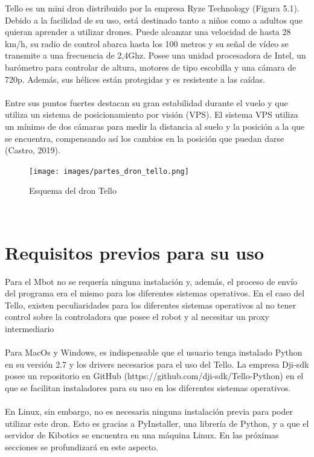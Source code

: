 \documentclass{report}
\begin{document}
Tello es un mini dron distribuido por la empresa Ryze Technology (Figura 5.1). Debido a la facilidad de su uso, está destinado tanto a niños como a adultos que quieran aprender a utilizar drones. Puede alcanzar una velocidad de hasta 28 km/h, su radio de control abarca hasta los 100 metros y su señal de vídeo se transmite a una frecuencia de 2,4Ghz. Posee una unidad procesadora de Intel, un barómetro para controlar de altura, motores de tipo escobilla y una cámara de 720p. Además, sus hélices están protegidas y es resistente a las caídas.
\\
\\
Entre sus puntos fuertes destacan su gran estabilidad durante el vuelo y que utiliza un sistema de posicionamiento por visión (VPS). El sistema VPS utiliza un mínimo de dos cámaras para medir la distancia al suelo y la posición a la que se encuentra, compensando así los cambios en la posición que puedan darse (Castro, 2019).
\\
\begin{figure}[h!]
  \centering
    \texttt{[image: images/partes\_dron\_tello.png]}
  \caption{Esquema del dron Tello}
  \label{Esquema del dron Tello}
\end{figure}
\\

\section{Requisitos previos para su uso}

Para el Mbot no se requería ninguna instalación y, además, el proceso de envío del programa era el mismo para los diferentes sistemas operativos. En el caso del Tello, existen peculiaridades para los diferentes sistemas operativos al no tener control sobre la controladora que posee el robot y al necesitar un proxy intermediario
\\
\\
Para MacOs y Windows, es indispensable que el usuario tenga instalado Python en su versión 2.7 y los drivers necesarios para el uso del Tello. La empresa Dji-sdk posee un repositorio en GitHub (https://github.com/dji-sdk/Tello-Python) en el que se facilitan instaladores para su uso en los diferentes sistemas operativos.
\\
\\
En Linux, sin embargo, no es necesaria ninguna instalación previa para poder utilizar este dron. Esto es gracias a PyInstaller, una librería de Python, y a que el servidor de Kibotics se encuentra en una máquina Linux. En las próximas secciones se profundizará en este aspecto.
\end{document}
